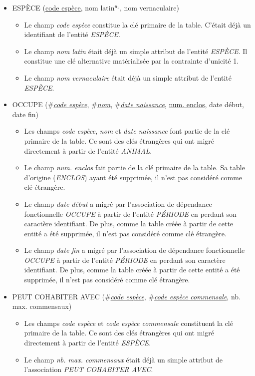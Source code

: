 \documentclass[a4paper]{article}
\newcommand{\relat}[1]{\textsc{#1}}
\newcommand{\attr}[1]{#1}
\newcommand{\prim}[1]{\uline{#1}}
\newcommand{\foreign}[1]{\#\textsl{#1}}
\begin{document}
\begin{itemize}
  \item \relat{ESPÈCE} (\prim{code espèce}, \attr{nom latin}$^{u_1}$, \attr{nom vernaculaire})
  \begin{itemize}
    \item Le champ \emph{code espèce} constitue la clé primaire de la table. C'était déjà un identifiant de l'entité \emph{ESPÈCE}.
    \item Le champ \emph{nom latin} était déjà un simple attribut de l'entité \emph{ESPÈCE}. Il constitue une clé alternative matérialisée par la contrainte d'unicité 1.
    \item Le champ \emph{nom vernaculaire} était déjà un simple attribut de l'entité \emph{ESPÈCE}.
  \end{itemize}

  \item \relat{OCCUPE} (\foreign{\prim{code espèce}}, \foreign{\prim{nom}}, \foreign{\prim{date naissance}}, \prim{num. enclos}, \attr{date début}, \attr{date fin})
  \begin{itemize}
    \item Les champs \emph{code espèce}, \emph{nom} et \emph{date naissance} font partie de la clé primaire de la table. Ce sont des clés étrangères qui ont migré directement à partir de l'entité \emph{ANIMAL}.
    \item Le champ \emph{num. enclos} fait partie de la clé primaire de la table. Sa table d'origine (\emph{ENCLOS}) ayant été supprimée, il n'est pas considéré comme clé étrangère.
    \item Le champ \emph{date début} a migré par l'association de dépendance fonctionnelle \emph{OCCUPE} à partir de l'entité \emph{PÉRIODE} en perdant son caractère identifiant. De plus, comme la table créée à partir de cette entité a été supprimée, il n'est pas considéré comme clé étrangère.
    \item Le champ \emph{date fin} a migré par l'association de dépendance fonctionnelle \emph{OCCUPE} à partir de l'entité \emph{PÉRIODE} en perdant son caractère identifiant. De plus, comme la table créée à partir de cette entité a été supprimée, il n'est pas considéré comme clé étrangère.
  \end{itemize}

  \item \relat{PEUT COHABITER AVEC} (\foreign{\prim{code espèce}}, \foreign{\prim{code espèce commensale}}, \attr{nb. max. commensaux})
  \begin{itemize}
    \item Les champs \emph{code espèce} et \emph{code espèce commensale} constituent la clé primaire de la table. Ce sont des clés étrangères qui ont migré directement à partir de l'entité \emph{ESPÈCE}.
    \item Le champ \emph{nb. max. commensaux} était déjà un simple attribut de l'association \emph{PEUT COHABITER AVEC}.
  \end{itemize}


\end{itemize}
\end{document}
